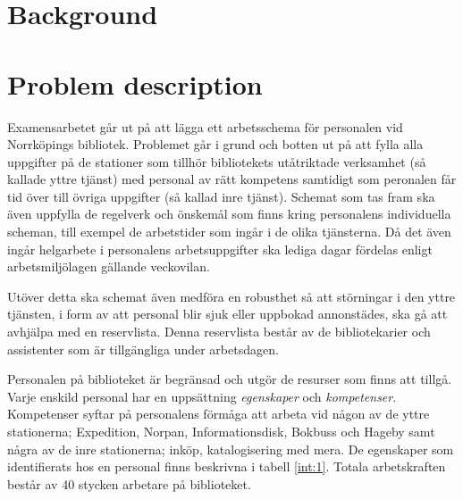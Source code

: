 

\section{Background}


\section{Problem description}
Examensarbetet går ut på att lägga ett arbetsschema för personalen vid Norrköpings bibliotek. Problemet går i grund och botten ut på att fylla alla uppgifter på de stationer som tillhör bibliotekets utåtriktade verksamhet (så kallade yttre tjänst) med personal av rätt kompetens samtidigt som peronalen får tid över till övriga uppgifter (så kallad inre tjänst). Schemat som tas fram ska även uppfylla de regelverk och önskemål som finns kring personalens individuella scheman, till exempel de arbetstider som ingår i de olika tjänsterna. Då det även ingår helgarbete i personalens arbetsuppgifter ska lediga dagar fördelas enligt arbetsmiljölagen gällande veckovilan.

Utöver detta ska schemat även medföra en robusthet så att störningar i den yttre tjänsten, i form av att personal blir sjuk eller uppbokad annonstädes, ska gå att avhjälpa med en reservlista. Denna reservlista består av de bibliotekarier och assistenter som är tillgängliga under arbetsdagen. 

Personalen på biblioteket är begränsad och utgör de resurser som finns att tillgå. Varje enskild personal har en uppsättning \textit{egenskaper} och \textit{kompetenser}. Kompetenser syftar på personalens förmåga att arbeta vid någon av de yttre stationerna; Expedition, Norpan, Informationsdisk, Bokbuss och Hageby samt några av de inre stationerna; inköp, katalogisering med mera. De egenskaper som identifierats hos en personal finns beskrivna i tabell \ref{int:1}. Totala arbetskraften består av 40 stycken arbetare på biblioteket.

